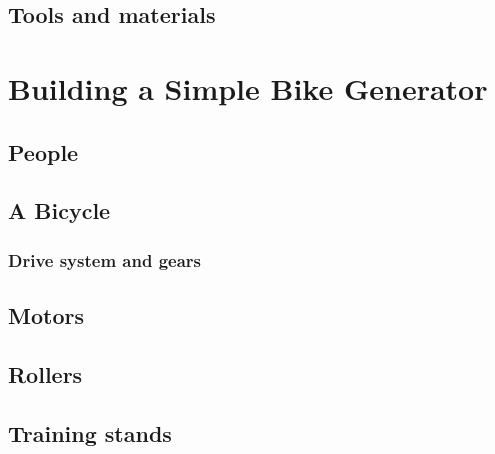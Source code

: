\documentclass{article}
\theoremstyle{definition}
\theoremstyle{definition}
\theoremstyle{remark}
\begin{document}
  \subsection{Tools and materials} %
  \label{sub:tools_and_materials}



\newpage

\section{Building a Simple Bike Generator} %
\label{sec:building_a_simple_bike_generator}

  \subsection{People} %
  \label{sub:people}
  

  \subsection{A Bicycle} %
  \label{sub:a_bicycle}
  
    \subsubsection{Drive system and gears} %
    \label{ssub:drive_system_and_gears}
    
  
  \subsection{Motors} %
  \label{sub:motors}
  

  \subsection{Rollers} %
  \label{sub:rollers}
  

  \subsection{Training stands} %
  \label{sub:training_stands}
  
\end{document}
